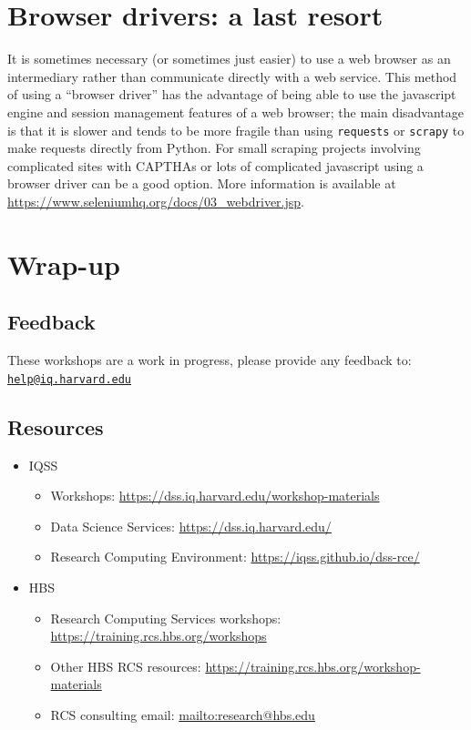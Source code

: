 \documentclass[
]{book}
\providecommand{\tightlist}{%
  \setlength{\itemsep}{0pt}\setlength{\parskip}{0pt}}
\begin{document}
\hypertarget{browser-drivers-a-last-resort}{%
\section{Browser drivers: a last resort}\label{browser-drivers-a-last-resort}}

It is sometimes necessary (or sometimes just easier) to use a web browser as an intermediary rather than communicate directly with a web service. This method of using a ``browser driver'' has the advantage of being able to use the javascript engine and session management features of a web browser; the main disadvantage is that it is slower and tends to be more fragile than using \texttt{requests} or \texttt{scrapy} to make requests directly from Python. For small scraping projects involving complicated sites with CAPTHAs or lots of complicated javascript using a browser driver can be a good option. More information is available at \url{https://www.seleniumhq.org/docs/03_webdriver.jsp}.

\hypertarget{wrap-up-6}{%
\section{Wrap-up}\label{wrap-up-6}}

\hypertarget{feedback-6}{%
\subsection{Feedback}\label{feedback-6}}

These workshops are a work in progress, please provide any feedback to: \href{mailto:help@iq.harvard.edu}{\nolinkurl{help@iq.harvard.edu}}

\hypertarget{resources-8}{%
\subsection{Resources}\label{resources-8}}

\begin{itemize}
\tightlist
\item
  IQSS

  \begin{itemize}
  \tightlist
  \item
    Workshops: \url{https://dss.iq.harvard.edu/workshop-materials}
  \item
    Data Science Services: \url{https://dss.iq.harvard.edu/}
  \item
    Research Computing Environment: \url{https://iqss.github.io/dss-rce/}
  \end{itemize}
\item
  HBS

  \begin{itemize}
  \tightlist
  \item
    Research Computing Services workshops: \url{https://training.rcs.hbs.org/workshops}
  \item
    Other HBS RCS resources: \url{https://training.rcs.hbs.org/workshop-materials}
  \item
    RCS consulting email: \url{mailto:research@hbs.edu}
  \end{itemize}
\end{itemize}
\end{document}
